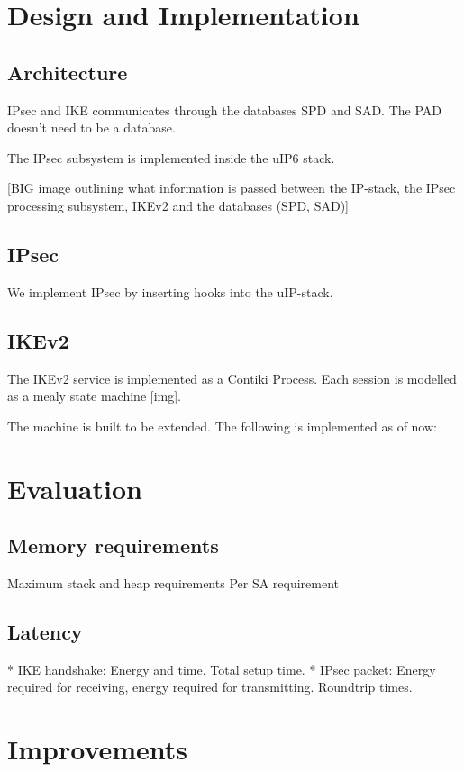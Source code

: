 \documentclass[final,letterpaper,twoside,12pt,twocolumn]{report}
\begin{document}
\chapter{Design and Implementation} 
\section{Architecture}
IPsec and IKE communicates through the databases SPD and SAD. The PAD doesn't need to be a database.

The IPsec subsystem is implemented inside the uIP6 stack.

[BIG image outlining what information is passed between the IP-stack, the IPsec processing subsystem, IKEv2 and the databases (SPD, SAD)]

\section{IPsec}
We implement IPsec by inserting hooks into the uIP-stack.

\section{IKEv2}
The IKEv2 service is implemented as a Contiki Process. Each session is modelled as a mealy state machine [img].

The machine is built to be extended. The following is implemented as of now:


\chapter{Evaluation}

\section{Memory requirements}
Maximum stack and heap requirements
Per SA requirement

\section{Latency}
* IKE handshake: Energy and time. Total setup time.
* IPsec packet: Energy required for receiving, energy required for transmitting. Roundtrip times.

\chapter{Improvements}




\end{document}
